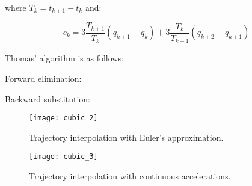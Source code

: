 where $T_k=t_{k+1}-t_k$ and:

\begin{equation*}
c_k=3\frac{T_{k+1}}{T_k}(q_{k+1}-q_k)+3\frac{T_{k}}{T_{k+1}}(q_{k+2}-q_{k+1})
\end{equation*}

Thomas' algorithm is as follows:

\begin{minipage}{0.5\textwidth}
Forward elimination:
\begin{center}
\begin{algorithmic}
    \EndFor
\end{algorithmic}
\end{center}
\end{minipage}
\begin{minipage}{0.5\textwidth}
Backward substitution:
\begin{center}
\begin{algorithmic}
    \EndFor
\end{algorithmic}
\end{center}
\end{minipage}


\begin{figure}[H]
\begin{minipage}{0.5\textwidth}
\centering
\texttt{[image: cubic\_2]}
\caption{Trajectory interpolation with Euler's approximation.}
\end{minipage}
\begin{minipage}{0.5\textwidth}
\centering
\texttt{[image: cubic\_3]}
\caption{Trajectory interpolation with continuous accelerations.}
\end{minipage}
\end{figure}